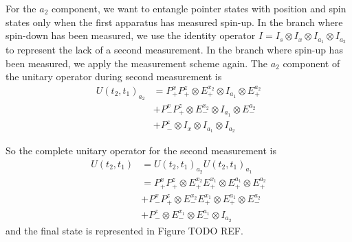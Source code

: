 For the $a_2$ component, we want to entangle pointer states with position and spin states only when the first apparatus has measured spin-up. In the branch where spin-down has been measured, we use the identity operator $I = I_s \otimes I_x \otimes I_{a_1} \otimes I_{a_2}$ to represent the lack of a second measurement. In the branch where spin-up has been measured, we apply the measurement scheme again. The $a_2$ component of the unitary operator during second measurement is
\begin{align}
  U(t_2, t_1)_{a_2} &= P^x_+ P^z_+ \otimes E^{x_2}_+ \otimes I_{a_1} \otimes E^{a_2}_+ \\ \nonumber
  &+ P^x_- P^z_+ \otimes E^{x_2}_- \otimes I_{a_1} \otimes E^{a_2}_- \\ \nonumber
  &+ P^z_- \otimes{I_x} \otimes I_{a_1} \otimes I_{a_2}
\end{align}

So the complete unitary operator for the second measurement is
\begin{align}
  U(t_2, t_1) &= U(t_2, t_1)_{a_2} U(t_2, t_1)_{a_1} \\ \nonumber
  &= P^x_+ P^z_+ \otimes E^{x_2}_+  E^{x_1}_+ \otimes E^{a_1}_+ \otimes E^{a_2}_+ \\ \nonumber
  &+ P^x_- P^z_+ \otimes E^{x_2}_-  E^{x_1}_+ \otimes E^{a_1}_+ \otimes E^{a_2}_- \\ \nonumber
  &+ P^z_- \otimes E^{x_1}_- \otimes E^{a_1}_- \otimes I_{a_2}
\end{align}
and the final state is represented in Figure TODO REF.


